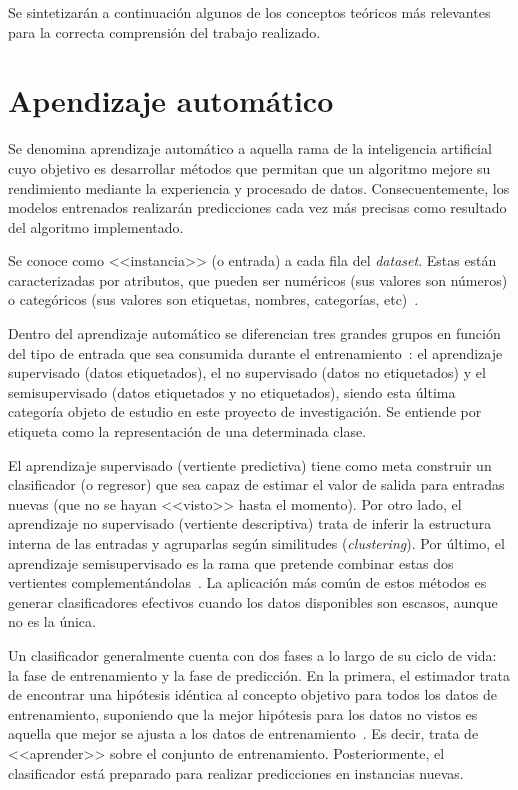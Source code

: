 
Se sintetizarán a continuación algunos de los conceptos teóricos más relevantes para la correcta comprensión del trabajo realizado.

\section{Apendizaje automático}

Se denomina aprendizaje automático a aquella rama de la inteligencia artificial cuyo objetivo es desarrollar métodos que permitan que un algoritmo mejore su rendimiento mediante la experiencia y procesado de datos. Consecuentemente, los modelos entrenados realizarán predicciones cada vez más precisas como resultado del algoritmo implementado.

Se conoce como <<instancia>> (o entrada) a cada fila del \textit{dataset}. Estas están caracterizadas por atributos, que pueden ser numéricos (sus valores son números) o categóricos (sus valores son etiquetas, nombres, categorías, etc)~\cite{apuntesSisint}.

Dentro del aprendizaje automático se diferencian tres grandes grupos en función del tipo de entrada que sea consumida durante el entrenamiento~\cite{engelen2020surveyOnSemiSupervised}: el aprendizaje supervisado (datos etiquetados), el no supervisado (datos no etiquetados) y el semisupervisado (datos etiquetados y no etiquetados), siendo esta última categoría objeto de estudio en este proyecto de investigación. Se entiende por etiqueta como la representación de una determinada clase. 

El aprendizaje supervisado (vertiente predictiva) tiene como meta construir un clasificador (o regresor) que sea capaz de estimar el valor de salida para entradas nuevas (que no se hayan <<visto>> hasta el momento). Por otro lado, el aprendizaje no supervisado (vertiente descriptiva) trata de inferir la estructura interna de las entradas y agruparlas según similitudes (\textit{clustering}). Por último, el aprendizaje semisupervisado es la rama que pretende combinar estas dos vertientes complementándolas~\cite{engelen2020surveyOnSemiSupervised}. La aplicación más común de estos métodos es generar clasificadores efectivos cuando los datos disponibles son escasos, aunque no es la única.

Un clasificador generalmente cuenta con dos fases a lo largo de su ciclo de vida: la fase de entrenamiento y la fase de predicción. En la primera, el estimador trata de encontrar una hipótesis idéntica al concepto objetivo para todos los datos de entrenamiento, suponiendo que la mejor hipótesis para los datos no vistos es aquella que mejor se ajusta a los datos de entrenamiento~\cite{mitchell1997machine}. Es decir, trata de <<aprender>> sobre el conjunto de entrenamiento. Posteriormente, el clasificador está preparado para realizar predicciones en instancias nuevas.

